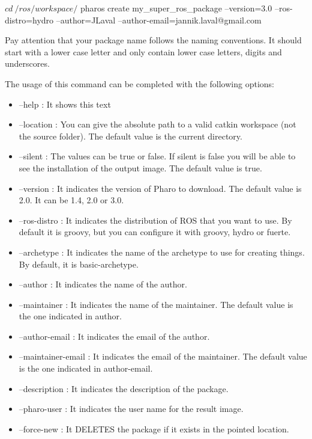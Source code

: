 \documentclass[a4paper,10pt,twoside]{book}
\begin{document}
\begin{code}{}
$ cd ~/ros/workspace/
$ pharos create my_super_ros_package --version=3.0 --ros-distro=hydro --author=JLaval --author-email=jannik.laval@gmail.com
\end{code}

Pay attention that your package name follows the naming conventions. It should start with a lower case letter and only contain lower case letters, digits and underscores.


The usage of this command can be completed with the following options:

\begin{itemize}
          \item --help : It shows this text
         \item --location : You can give the absolute path to a valid catkin workspace (not the source folder). The default value is the current directory.
          \item --silent : The values can be true or false. If silent is false you will be able to see the installation of the output image. The default value is true. 
         \item --version : It indicates the version of Pharo to download. The default value is 2.0. It can be 1.4, 2.0 or 3.0.
          \item --ros-distro : It indicates the distribution of ROS that you want to use. By default it is groovy, but you can configure it with groovy, hydro or fuerte.	
          
          
          \item --archetype : It indicates the name of the archetype to use for creating things. By default, it is basic-archetype.
          \item --author :	It indicates the name of the author.
          \item --maintainer : It indicates the name of the maintainer. The default value is the one indicated in author.
          \item --author-email : It indicates the email  of the author.
          \item --maintainer-email : 	It indicates the email of the maintainer. The default value is the one indicated in author-email.
          \item --description : It indicates the description of the package.
          \item --pharo-user : It indicates the user name for the result image.
          \item --force-new : It DELETES the package if it exists in the pointed location.
\end{itemize}
\end{document}
